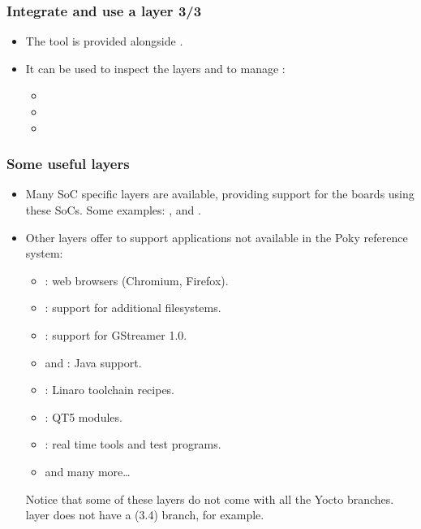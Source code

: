 \begin{frame}
  \frametitle{Integrate and use a layer 3/3}
  \begin{itemize}
    \item The  tool is provided alongside
      .
    \item It can be used to inspect the layers and to manage
      :
    \begin{itemize}
      \item {}
      \item {}
      \item {}
    \end{itemize}
  \end{itemize}
\end{frame}

\begin{frame}
  \frametitle{Some useful layers}
  \begin{itemize}
    \item Many SoC specific layers are available, providing support
      for the boards using these SoCs. Some examples: ,
       and .
    \item Other layers offer to support applications not available in
      the Poky reference system:
    \begin{itemize}
      \item {}: web browsers (Chromium, Firefox).
      \item {}: support for additional
        filesystems.
      \item {}: support for GStreamer 1.0.
      \item {} and : Java support.
      \item {}: Linaro toolchain recipes.
      \item {}: QT5 modules.
      \item {}: real time tools and test programs.
      \item {} and many more\dots
    \end{itemize}
    Notice that some of these layers do not come with all the Yocto
    branches.  layer does not have a 
    (3.4) branch, for example.
  \end{itemize}
\end{frame}

